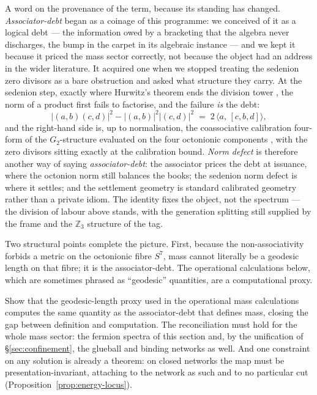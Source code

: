 A word on the provenance of the term, because its standing has changed.
\emph{Associator-debt} began as a coinage of this programme: we conceived of it
as a logical debt --- the information owed by a bracketing that the algebra
never discharges, the bump in the carpet in its algebraic instance --- and we
kept it because it priced the mass sector correctly, not because the object had
an address in the wider literature. It acquired one when we stopped treating
the sedenion zero divisors as a bare obstruction and asked what structure they
carry. At the sedenion step, exactly where Hurwitz's theorem ends the division
tower \autocite{hurwitz1898composition}, the norm of a product first fails to factorise,
and the failure \emph{is} the debt:
\begin{equation}
  \bigl\lvert (a,b)(c,d) \bigr\rvert^{2}
  - \bigl\lvert (a,b) \bigr\rvert^{2} \bigl\lvert (c,d) \bigr\rvert^{2}
  \;=\; 2 \,\bigl\langle a,\, [c,b,d] \bigr\rangle ,
  \label{eq:debt-defect}
\end{equation}
and the right-hand side is, up to normalisation, the coassociative calibration
four-form of the $G_2$-structure evaluated on the four octonionic components
\autocite{harvey1982calibrated,bryant1987exceptional}, with the zero divisors
sitting exactly at the calibration bound. \emph{Norm defect} is therefore
another way of saying \emph{associator-debt}: the associator prices the debt at
issuance, where the octonion norm still balances the books; the sedenion norm
defect is where it settles; and the settlement geometry is standard calibrated
geometry rather than a private idiom. The identity fixes the object, not the
spectrum --- the division of labour above stands, with the generation splitting
still supplied by the frame and the $\mathbb{Z}_3$ structure of the tag.

Two structural points complete the picture. First, because the non-associativity forbids a metric on
the octonionic fibre $S^7$, mass cannot literally be a geodesic length on that fibre; it is the
associator-debt. The operational calculations below, which are sometimes phrased as ``geodesic''
quantities, are a computational proxy.

\begin{openproblem}\label{op:associator-geodesic}
Show that the geodesic-length proxy used in the operational mass calculations computes the same
quantity as the associator-debt that defines mass, closing the gap between definition and
computation. The reconciliation must hold for the whole mass sector: the fermion spectra of this
section and, by the unification of \S\ref{sec:confinement}, the glueball and binding networks as
well. And one constraint on any solution is already a theorem: on closed networks the map must be
presentation-invariant, attaching to the network as such and to no particular cut
(Proposition~\ref{prop:energy-locus}).
\end{openproblem}

